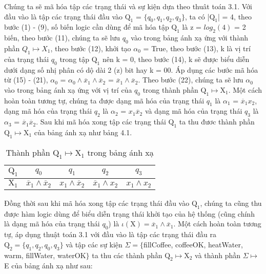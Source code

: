 \documentclass[a4paper,13pt,oneside,openany]{book}
\begin{document}
\begin{flushleft}
	Chúng ta sẽ mã hóa tập các trạng thái và sự kiện dựa theo thuât toán 3.1. Với đầu vào là tập các trạng thái đầu vào $\textrm{Q}_1$ = $\{q_0, q_1, q_2, q_3\}$, ta có |$\textrm{Q}_1$| = 4, theo bước (1) - (9), số biến logic cần dùng để mã hóa tập $\textrm{Q}_1$ là z = $log_2(4)$ = 2 biến, theo bước (11), chúng ta sẽ lưu $q_0$ vào trong bảng ánh xạ ứng với thành phần $Q_1 \mapsto X_1$, theo bước (12), khởi tạo $\alpha_0$ = True, theo bước (13), k là vị trí của trạng thái $q_0$ trong tập $\textrm{Q}_1$ nên k = 0, theo bước (14), k sẽ được biểu diễn dưới dạng số nhị phân có dộ dài 2 (z) bit hay k = 00. Áp dụng các bước mã hóa từ (15) - (21), $\alpha_0$ = $\alpha_0 \land \overline{x}_1 \land \overline{x}_2$ = $\overline{x}_1 \land \overline{x}_2$. Theo bước (22), chúng ta sẽ lưu $\alpha_0$ vào trong bảng ánh xạ ứng với vị trí của $q_0$ trong thành phần $\textrm{Q}_1 \mapsto \textrm{X}_1$. Một cách hoàn toàn tương tự, chúng ta được dạng mã hóa của trạng thái $q_1$ là $\alpha_1$ = $\overline{x}_1x_2$, dạng mã hóa của trạng thái $q_2$ là $\alpha_2$ = $x_1\overline{x}_2$ và dạng mã hóa của trạng thái $q_3$ là $\alpha_3$ = $\overline{x}_1\overline{x}_2$. Sau khi mã hóa xong tập các trạng thái $\textrm{Q}_1$ ta thu đươc thành phần $\textrm{Q}_1 \mapsto \textrm{X}_1$ của bảng ánh xạ như bảng 4.1.
	\begin{table}[!ht]
		\centering
		\renewcommand{\arraystretch}{1.25}
		\begin{tabular}{|c|c|c|c|c|}
			\hline
			$\textrm{Q}_1$ & $q_0$ & $q_1$ & $q_2$ & $q_3$\\
			\hline
			$\textrm{X}_1$ & $\overline{x}_1 \land \overline{x}_2$ & $x_1\land\overline{x}_2$&$\overline{x}_1\land x_2$ &
			$x_1 \land x_2$\\
			\hline
		\end{tabular}
		\caption{Thành phần $\textrm{Q}_1 \mapsto \textrm{X}_1$ trong bảng ánh xạ}
	\end{table}
	\noindent
	Đồng thời sau khi mã hóa xong tập các trạng thái đầu vào $\textrm{Q}_1$, chúng ta cũng thu được hàm logic dùng để biểu diễn trạng thái khởi tạo của hệ thống (cũng chính là dạng mã hóa của trạng thái $q_0$) là $\iota(\textrm{X}) = \overline{x}_1 \land \overline{x}_1$. Một cách hoàn toàn tương tự, áp dụng thuật toán 3.1 với đầu vào là tập các trạng thái đầu ra $\textrm{Q}_2 = \{q_1, q_2, q_0, q_3\}$ và tập các sự kiện $\Sigma = \{$fillCoffee, coffeeOK, heatWater, warm, fillWater, waterOK$\}$ ta thu các thành phần $\textrm{Q}_2 \mapsto \textrm{X}_2$ và thành phần $\Sigma \mapsto$ E của bảng ánh xạ như sau:
	

\end{flushleft}
\end{document}

